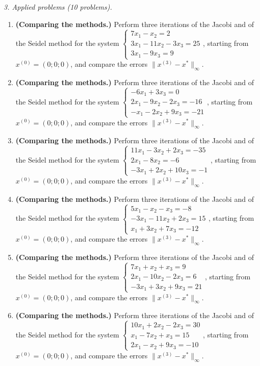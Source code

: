 \emph{3. Applied problems (10 problems).}
\bigskip
\begin{enumerate}[label=\arabic*., leftmargin=*]
\item \textbf{(Comparing the methods.)} Perform three iterations of the Jacobi and of the Seidel method for the system $\begin{cases}7x_1-x_2=2\\3x_1-11x_2-3x_3=25\\3x_1-9x_3=9\end{cases}$, starting from $x^{(0)}=(0;0;0)$, and compare the errors $\|x^{(3)}-x^*\|_\infty$.
\item \textbf{(Comparing the methods.)} Perform three iterations of the Jacobi and of the Seidel method for the system $\begin{cases}-6x_1+3x_3=0\\2x_1-9x_2-2x_3=-16\\-x_1-2x_2+9x_3=-21\end{cases}$, starting from $x^{(0)}=(0;0;0)$, and compare the errors $\|x^{(3)}-x^*\|_\infty$.
\item \textbf{(Comparing the methods.)} Perform three iterations of the Jacobi and of the Seidel method for the system $\begin{cases}11x_1-3x_2+2x_3=-35\\2x_1-8x_2=-6\\-3x_1+2x_2+10x_3=-1\end{cases}$, starting from $x^{(0)}=(0;0;0)$, and compare the errors $\|x^{(3)}-x^*\|_\infty$.
\item \textbf{(Comparing the methods.)} Perform three iterations of the Jacobi and of the Seidel method for the system $\begin{cases}5x_1-x_2-x_3=-8\\-3x_1-11x_2+2x_3=15\\x_1+3x_2+7x_3=-12\end{cases}$, starting from $x^{(0)}=(0;0;0)$, and compare the errors $\|x^{(3)}-x^*\|_\infty$.
\item \textbf{(Comparing the methods.)} Perform three iterations of the Jacobi and of the Seidel method for the system $\begin{cases}7x_1+x_2+x_3=9\\2x_1-10x_2-2x_3=6\\-3x_1+3x_2+9x_3=21\end{cases}$, starting from $x^{(0)}=(0;0;0)$, and compare the errors $\|x^{(3)}-x^*\|_\infty$.
\item \textbf{(Comparing the methods.)} Perform three iterations of the Jacobi and of the Seidel method for the system $\begin{cases}10x_1+2x_2-2x_3=30\\x_1-7x_2+x_3=15\\2x_1-x_2+9x_3=-10\end{cases}$, starting from $x^{(0)}=(0;0;0)$, and compare the errors $\|x^{(3)}-x^*\|_\infty$.

\end{enumerate}

